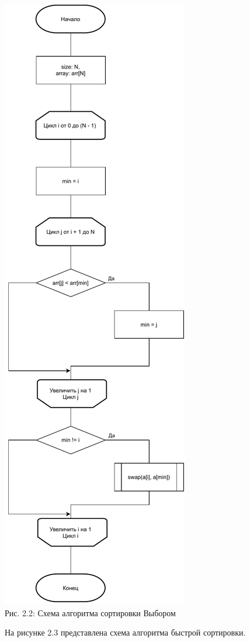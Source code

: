 \documentclass[12pt,a4paper]{article}
\numberwithin{equation}{section}
\begin{document}
\begin{center}	
	\includegraphics[width=.4\linewidth]{src/schemas/ShellSort}\\
	Рис. 2.2: Схема алгоритма сортировки Выбором
\end{center}
\clearpage
На рисунке 2.3 представлена схема алгоритма быстрой сортировки.\\
\end{document}
